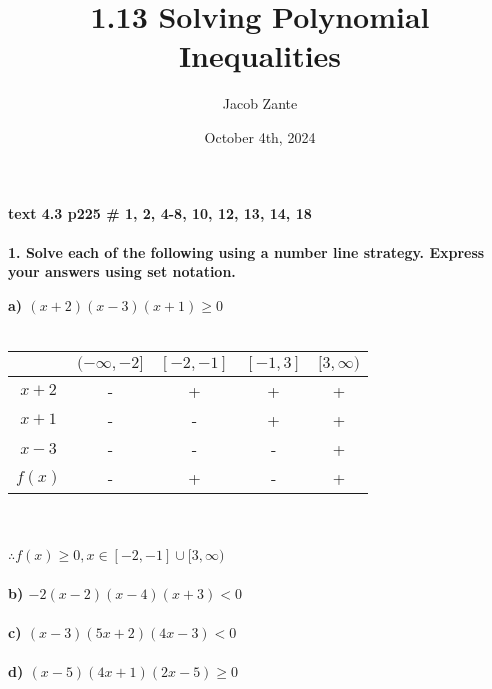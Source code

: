 \documentclass[14pt, a4paper]{extarticle}
\title{1.13 Solving Polynomial Inequalities}
\author{Jacob Zante}
\date{October 4th, 2024}
\begin{document}
\maketitle
\setlength{\parindent}{0pt}


\textbf{text 4.3 p225 \# 1, 2, 4-8, 10, 12, 13, 14, 18} \\
\\
\textbf{1. Solve each of the following using a number line strategy. Express your answers using set notation.} \\
\begin{adjustwidth}{1cm}{0pt}
    \textbf{a) $(x + 2)(x - 3)(x + 1) \geq 0$} \\
    \\
    \begin{tabular}{ c | c | c | c | c }
         & $(-\infty, -2]$ & $[-2, -1]$ & $[-1, 3]$ & $[3, \infty)$ \\
        \hline
        $x + 2$ & - & + & + & + \\
        \hline
        $x + 1$ & - & - & + & + \\
        \hline
        $x - 3$ & - & - & - & + \\
        \hline
        $f(x)$  & - & + & - & + \\
    \end{tabular} \\
    \\
    $\therefore f(x) \geq 0, x \in [-2, -1] \cup [3, \infty)$ \\
    \\
    \textbf{b) $-2(x - 2)(x - 4)(x + 3) < 0$} \\
    \\
    \textbf{c) $(x - 3)(5x + 2)(4x - 3) < 0$} \\
    \\
    \textbf{d) $(x - 5)(4x + 1)(2x - 5) \geq 0$} \\
\end{adjustwidth}
\end{document}
